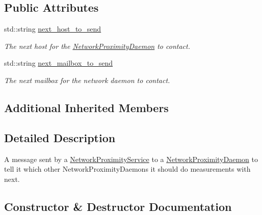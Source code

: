 \subsection*{Public Attributes}
\begin{DoxyCompactItemize}
\item 
\mbox{\label{classwrench_1_1_next_contact_daemon_answer_message_a7fb569a3d840c5f2df40bc6c9bda6c1d}} 
std\+::string \hyperlink{classwrench_1_1_next_contact_daemon_answer_message_a7fb569a3d840c5f2df40bc6c9bda6c1d}{next\+\_\+host\+\_\+to\+\_\+send}
\begin{DoxyCompactList}\small\item\em The next host for the \hyperlink{classwrench_1_1_network_proximity_daemon}{Network\+Proximity\+Daemon} to contact. \end{DoxyCompactList}\item 
\mbox{\label{classwrench_1_1_next_contact_daemon_answer_message_a95be68ada26066126f8a7f8c428c7f08}} 
std\+::string \hyperlink{classwrench_1_1_next_contact_daemon_answer_message_a95be68ada26066126f8a7f8c428c7f08}{next\+\_\+mailbox\+\_\+to\+\_\+send}
\begin{DoxyCompactList}\small\item\em The next mailbox for the network daemon to contact. \end{DoxyCompactList}\end{DoxyCompactItemize}
\subsection*{Additional Inherited Members}


\subsection{Detailed Description}
A message sent by a \hyperlink{classwrench_1_1_network_proximity_service}{Network\+Proximity\+Service} to a \hyperlink{classwrench_1_1_network_proximity_daemon}{Network\+Proximity\+Daemon} to tell it which other Network\+Proximity\+Daemons it should do measurements with next. 

\subsection{Constructor \& Destructor Documentation}
\mbox{\label{classwrench_1_1_next_contact_daemon_answer_message_af2f82e308f4390218217184b18bb83dc}} 
